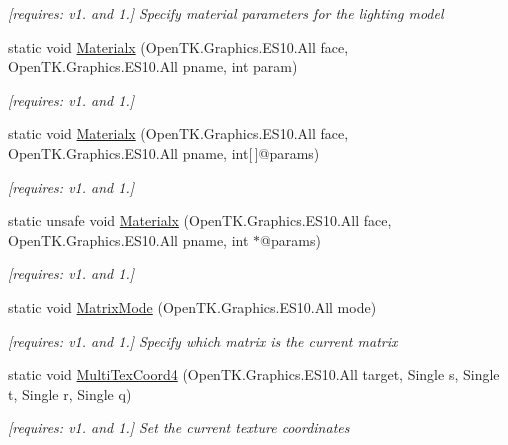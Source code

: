 \begin{DoxyCompactItemize}
\begin{DoxyCompactList}\small\item\em \mbox{[}requires\-: v1. and 1.\mbox{]} Specify material parameters for the lighting model \end{DoxyCompactList}\item 
static void \hyperlink{class_open_t_k_1_1_graphics_1_1_e_s10_1_1_g_l_af8028b900a7d9bda60c62720a0cb56dc}{Materialx} (Open\-T\-K.\-Graphics.\-E\-S10.\-All face, Open\-T\-K.\-Graphics.\-E\-S10.\-All pname, int param)
\begin{DoxyCompactList}\small\item\em \mbox{[}requires\-: v1. and 1.\mbox{]}\end{DoxyCompactList}\item 
static void \hyperlink{class_open_t_k_1_1_graphics_1_1_e_s10_1_1_g_l_a79904408b7b6b47837cb3585233fa12c}{Materialx} (Open\-T\-K.\-Graphics.\-E\-S10.\-All face, Open\-T\-K.\-Graphics.\-E\-S10.\-All pname, int\mbox{[}$\,$\mbox{]}@params)
\begin{DoxyCompactList}\small\item\em \mbox{[}requires\-: v1. and 1.\mbox{]}\end{DoxyCompactList}\item 
static unsafe void \hyperlink{class_open_t_k_1_1_graphics_1_1_e_s10_1_1_g_l_aca7db4556498f3975489101471654bd2}{Materialx} (Open\-T\-K.\-Graphics.\-E\-S10.\-All face, Open\-T\-K.\-Graphics.\-E\-S10.\-All pname, int $\ast$@params)
\begin{DoxyCompactList}\small\item\em \mbox{[}requires\-: v1. and 1.\mbox{]}\end{DoxyCompactList}\item 
static void \hyperlink{class_open_t_k_1_1_graphics_1_1_e_s10_1_1_g_l_af2cbd9d200eab1dd49e519294fafe9fa}{Matrix\-Mode} (Open\-T\-K.\-Graphics.\-E\-S10.\-All mode)
\begin{DoxyCompactList}\small\item\em \mbox{[}requires\-: v1. and 1.\mbox{]} Specify which matrix is the current matrix \end{DoxyCompactList}\item 
static void \hyperlink{class_open_t_k_1_1_graphics_1_1_e_s10_1_1_g_l_a14cfa1820db4ac51cc5cae18a7515a2a}{Multi\-Tex\-Coord4} (Open\-T\-K.\-Graphics.\-E\-S10.\-All target, Single s, Single t, Single r, Single q)
\begin{DoxyCompactList}\small\item\em \mbox{[}requires\-: v1. and 1.\mbox{]} Set the current texture coordinates \end{DoxyCompactList}\item 

\end{DoxyCompactItemize}
